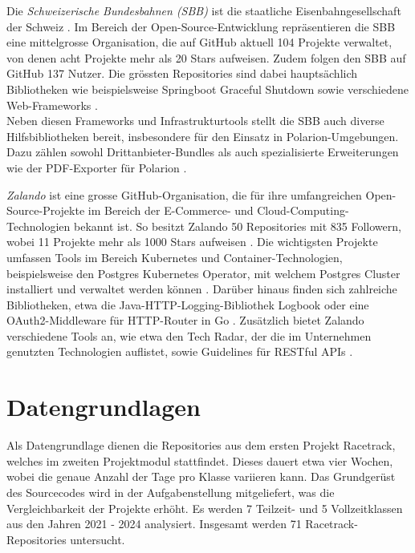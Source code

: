 Die \textit{Schweizerische Bundesbahnen (SBB)} ist die staatliche Eisenbahngesellschaft der Schweiz \parencite{uvek_verkehr_energie_und_kommunikation_eidgenossisches_departement_fur_umwelt_schweizerische_nodate}. Im Bereich der Open-Source-Entwicklung repräsentieren die SBB eine mittelgrosse Organisation, die auf GitHub aktuell 104 Projekte verwaltet, von denen acht Projekte mehr als 20 Stars aufweisen. Zudem folgen den SBB auf GitHub 137 Nutzer. Die grössten Repositories sind dabei hauptsächlich Bibliotheken wie beispielsweise Springboot Graceful Shutdown sowie verschiedene Web-Frameworks \parencite{noauthor_schweizerischebundesbahnenspringboot-graceful-shutdown_2025} \parencite{noauthor_schweizerischebundesbahnenscion-workbench_2025} \parencite{noauthor_schweizerischebundesbahnenscion-microfrontend-platform_2025}. \\ Neben diesen Frameworks und Infrastrukturtools stellt die SBB auch diverse Hilfsbibliotheken bereit, insbesondere für den Einsatz in Polarion-Umgebungen. Dazu zählen sowohl Drittanbieter-Bundles \parencite{noauthor_schweizerischebundesbahnenchsbbpolarionthirdpartybundles_nodate} als auch spezialisierte Erweiterungen wie der PDF-Exporter für Polarion \parencite{noauthor_schweizerischebundesbahnenchsbbpolarionextensionpdf-exporter_2025}.\parencite{noauthor_swiss_nodate}


\textit{Zalando} ist eine grosse GitHub-Organisation, die für ihre umfangreichen Open-Source-Projekte im Bereich der E-Commerce- und Cloud-Computing-Technologien bekannt ist. So besitzt Zalando 50 Repositories mit 835 Followern, wobei 11 Projekte mehr als 1000 Stars aufweisen \parencite{noauthor_zalando_nodate}. Die wichtigsten Projekte umfassen Tools im Bereich Kubernetes und Container-Technologien, beispielsweise den Postgres Kubernetes Operator, mit welchem Postgres Cluster installiert und verwaltet werden können \parencite{noauthor_zalandopostgres-operator_2025}. Darüber hinaus finden sich zahlreiche Bibliotheken, etwa die Java-HTTP-Logging-Bibliothek Logbook oder eine OAuth2-Middleware für HTTP-Router in Go \parencite{noauthor_zalandologbook_2025} \parencite{noauthor_zalandogin-oauth2_nodate}. Zusätzlich bietet Zalando verschiedene Tools an, wie etwa den Tech Radar, der die im Unternehmen genutzten Technologien auflistet, sowie Guidelines für RESTful APIs \parencite{noauthor_zalandotech-radar_nodate} \parencite{noauthor_zalandorestful-api-guidelines_nodate}.


\section{Datengrundlagen}
\label{sec:Datengrundlagen}
Als Datengrundlage dienen die Repositories aus dem ersten Projekt Racetrack, welches im zweiten Projektmodul stattfindet. Dieses dauert etwa vier Wochen, wobei die genaue Anzahl der Tage pro Klasse variieren kann. Das Grundgerüst des Sourcecodes wird in der Aufgabenstellung mitgeliefert, was die Vergleichbarkeit der Projekte erhöht. Es werden 7 Teilzeit- und 5 Vollzeitklassen aus den Jahren 2021 - 2024 analysiert. Insgesamt werden 71 Racetrack-Repositories untersucht. 
